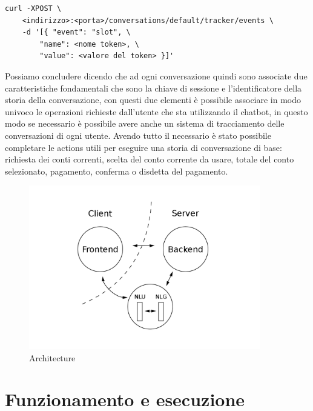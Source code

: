 \begin{lstlisting}[caption={Comando da eseguire per valorizzare gli slots}]
curl -XPOST \
    <indirizzo>:<porta>/conversations/default/tracker/events \
    -d '[{ "event": "slot", \
        "name": <nome token>, \
        "value": <valore del token> }]'
\end{lstlisting}
Possiamo concludere dicendo che ad ogni conversazione quindi sono associate due caratteristiche fondamentali che sono la chiave di sessione e l'identificatore della storia della conversazione, con questi due elementi è possibile associare in modo univoco le operazioni richieste dall'utente che sta utilizzando il chatbot, in questo modo se necessario è possibile avere anche un sistema di tracciamento delle conversazioni di ogni utente.
Avendo tutto il necessario è stato possibile completare le actions utili per eseguire una storia di conversazione di base: richiesta dei conti correnti, scelta del conto corrente da usare, totale del conto selezionato, pagamento, conferma o disdetta del pagamento.
\begin{figure}[H]
 \centering
    \includegraphics[width=0.9\textwidth]{img/last_architecture.png}
 \caption{Architecture}
\end{figure}

\section{Funzionamento e esecuzione}

